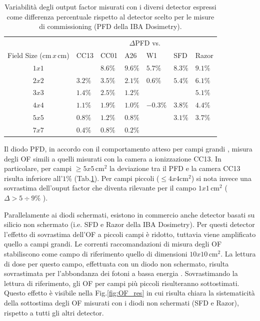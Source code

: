\begin{table}
\centering
{}
\begin{tabular}{cllllll}
\toprule
  & \multicolumn{6}{c}{$\Delta$PFD vs.}\\
  \cmidrule{2-7}
 
Field Size (cm$\,x\,$cm) & CC13 & CC01 & A26 & W1 & SFD & Razor\\
\midrule
$1x1$ &        & $8.6\%$ & $9.6\%$ & $5.7\%$ & $8.3\%$ & $9.1\%$\\
$2x2$ & $3.2\%$ & $3.5\%$ & $2.1\%$ & $0.6\%$ & $5.4\%$ & $6.1\%$\\
$3x3$ & $1.4\%$ & $2.5\%$ & $1.2\%$ &  &      & $5.1\%$ \\
$4x4$ & $1.1\%$ & $1.9\%$ & $1.0\%$ & $-0.3\%$ & $3.8\%$ & $4.4\%$ \\
$5x5$ & $0.8\%$ & $1.2\%$ & $0.8\%$	&         & $3.1\%$ & $3.7\%$ \\
$7x7$ & $0.4\%$ & $0.8\%$ & $0.2\%$	&         &         &         \\
\bottomrule
\end{tabular}
\caption{Variabilità degli output factor misurati con i diversi detector espressi come differenza percentuale rispetto al detector scelto per le misure di commissioning (PFD della IBA Dosimetry).}
\label{tab:delta_OF}
\end{table}

Il diodo PFD, in accordo con il comportamento atteso per campi grandi \cite{Griessbach2005}, misura degli OF simili a quelli misurati con la camera a ionizzazione CC13. In particolare, per campi $\geq 5x5\,$cm$^2$ la deviazione tra il PFD e la camera CC13 risulta inferiore all'$1\%$ (Tab.\ref{tab:delta_OF}). Per campi piccoli ($\leq 4x4$cm$^2$) si nota invece una sovrastima dell'ouput factor che diventa rilevante per il campo $1x1\,$cm$^2$ ($\Delta > 5\div9\%$ ).

Parallelamente ai diodi schermati, esistono in commercio anche detector basati su silicio non schermato (i.e. SFD e Razor della IBA Dosimetry). Per questi detector l'effetto di sovrastima dell'OF a piccoli campi è ridotto, tuttavia viene amplificato quello a campi grandi. Le correnti raccomandazioni di misura degli OF \cite{Andreo2006,RaySearchLaboratories2014} stabiliscono come campo di riferimento quello di dimensioni $10x10\,$cm$^2$. La lettura di dose per questo campo, effettuata con un diodo non schermato, risulta sovrastimata per l'abbondanza dei fotoni a bassa energia \cite{Griessbach2005}. Sovrastimando la lettura di riferimento, gli OF per campi più piccoli risulteranno sottostimati. Questo effetto è visibile nella Fig.\ref{fig:OF_res} in cui risulta chiara la sistematicità della sottostima degli OF misurati con i diodi non schermati (SFD e Razor), rispetto a tutti gli altri detector.

